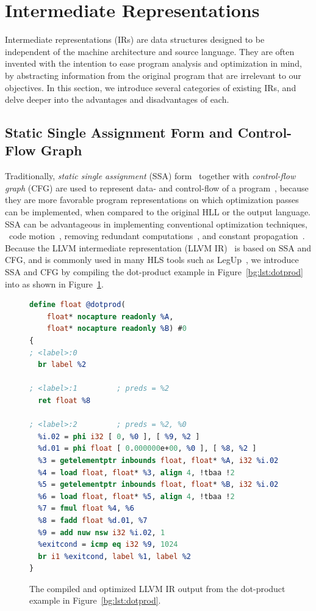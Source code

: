 \section{Intermediate Representations}
\label{bg:sec:intermediate}

Intermediate representations (IRs) are data structures designed to be
independent of the machine architecture and source language.  They are often
invented with the intention to ease program analysis and optimization in mind,
by abstracting information from the original program that are irrelevant to our
objectives.  In this section, we introduce several categories of existing IRs,
and delve deeper into the advantages and disadvantages of each.

\subsection{Static Single Assignment Form and Control-Flow Graph}
\label{bg:sub:ssa_cfg}

Traditionally, \emph{static single assignment} (SSA) form~\cite{alpern88,
rau92} together with \emph{control-flow graph} (CFG) are used to represent
data- and control-flow of a program~\cite{cytron91}, because they are more
favorable program representations on which optimization passes can be
implemented, when compared to the original HLL or the output language.  SSA can
be advantageous in implementing conventional optimization techniques, \eg~code
motion~\cite{cytron86}, removing redundant computations~\cite{rosen88},
and constant propagation~\cite{cytron91}.  Because the LLVM intermediate
representation (LLVM IR)~\cite{llvm_ir} is based on SSA and CFG, and is
commonly used in many HLS tools such as LegUp~\cite{legup}, we introduce SSA
and CFG by compiling the dot-product example in Figure~\ref{bg:lst:dotprod}
into as shown in Figure~\ref{bg:lst:dotprod_ll}.
\begin{figure}[ht]
    \centering
    \begin{lstlisting}[language=LLVM]
define float @dotprod(
    float* nocapture readonly %A,
    float* nocapture readonly %B) #0
{
; <label>:0
  br label %2

; <label>:1         ; preds = %2
  ret float %8

; <label>:2         ; preds = %2, %0
  %i.02 = phi i32 [ 0, %0 ], [ %9, %2 ]
  %d.01 = phi float [ 0.000000e+00, %0 ], [ %8, %2 ]
  %3 = getelementptr inbounds float, float* %A, i32 %i.02
  %4 = load float, float* %3, align 4, !tbaa !2
  %5 = getelementptr inbounds float, float* %B, i32 %i.02
  %6 = load float, float* %5, align 4, !tbaa !2
  %7 = fmul float %4, %6
  %8 = fadd float %d.01, %7
  %9 = add nuw nsw i32 %i.02, 1
  %exitcond = icmp eq i32 %9, 1024
  br i1 %exitcond, label %1, label %2
}
    \end{lstlisting}
    \caption{%
        The compiled and optimized LLVM IR output from the dot-product example
        in Figure~\ref{bg:lst:dotprod}.
    }\label{bg:lst:dotprod_ll}
\end{figure}

